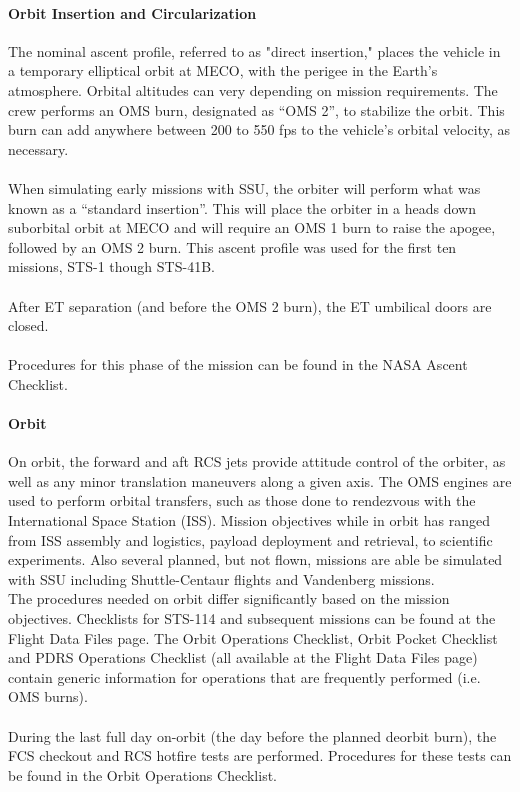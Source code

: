 \documentclass[13pt]{article}
\begin{document}
\begin{multicols*}{2}
\paragraph{Orbit Insertion and Circularization}
The nominal ascent profile, referred to as "direct insertion," places the vehicle in a temporary elliptical orbit at MECO, with the perigee in the Earth's atmosphere. Orbital altitudes can very depending on mission requirements. The crew performs an OMS burn, designated as ``OMS 2'', to stabilize the orbit. This burn can add anywhere between 200 to 550 fps to the vehicle's orbital velocity, as necessary.\\
\\
When simulating early missions with SSU, the orbiter will perform what was known as a ``standard insertion''. This will place the orbiter in a heads down suborbital orbit at MECO and will require an OMS 1 burn to raise the apogee, followed by an OMS 2 burn.  This ascent profile was used for the first ten missions, STS-1 though STS-41B.\\
\\
After ET separation (and before the OMS 2 burn), the ET umbilical doors are closed.\\
\\
Procedures for this phase of the mission can be found in the NASA Ascent Checklist.
\paragraph{Orbit}
On orbit, the forward and aft RCS jets provide attitude control of the orbiter, as well as any minor translation maneuvers along a given axis. The OMS engines are used to perform orbital transfers, such as those done to rendezvous with the International Space Station (ISS). Mission objectives while in orbit has ranged from ISS assembly and logistics, payload deployment and retrieval, to scientific experiments. Also several planned, but not flown, missions are able be simulated with SSU including Shuttle-Centaur flights and Vandenberg missions.
\\
The procedures needed on orbit differ significantly based on the mission objectives. Checklists for STS-114 and subsequent missions can be found at the Flight Data Files page. The Orbit Operations Checklist, Orbit Pocket Checklist and PDRS Operations Checklist (all available at the Flight Data Files page) contain generic information for operations that are frequently performed (i.e. OMS burns).\\
\\
During the last full day on-orbit (the day before the planned deorbit burn), the FCS checkout and RCS hotfire tests are performed. Procedures for these tests can be found in the Orbit Operations Checklist.

\end{multicols*}
\end{document}
